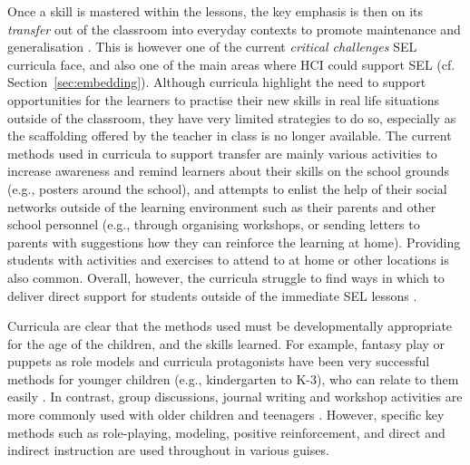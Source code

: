 \documentclass[prodmode,acmtochi]{acmsmall}
\newcommand{\todo}[1]{\textrm{\textrm{\textcolor{LightBlue}{[[#1]]}}}}
\newcommand{\todolater}[1]{}
\begin{document}
Once a skill is mastered within the lessons, the key emphasis is then on its \emph{transfer} out of the classroom into everyday contexts to promote maintenance and generalisation \cite{Elias1997,Maree2007,Pasi2001}. This is however one of the current \emph{critical challenges} SEL curricula face, and also one of the main areas where HCI could support SEL (cf. Section~\ref{sec:embedding}). Although curricula highlight the need to support opportunities for the learners to practise their new skills in real life situations outside of the classroom, they have very limited strategies to do so, especially as the scaffolding offered by the teacher in class is no longer available. The current methods used in curricula to support transfer are mainly various activities to increase awareness and remind learners about their skills on the school grounds (e.g., posters around the school), and attempts to enlist the help of their social networks outside of the learning environment such as their parents and other school personnel (e.g., through organising workshops, or sending letters to parents with suggestions how they can reinforce the learning at home). Providing students with activities and exercises to attend to at home or other locations is also common. Overall, however, the curricula struggle to find ways in which to deliver direct support for students outside of the immediate SEL lessons \cite{jones2012social,Maree2007}.  


Curricula are clear that the methods used must be developmentally appropriate for the age of the children, and the skills learned. For example, fantasy play or puppets as role models and curricula protagonists have been very successful methods for younger children (e.g., kindergarten to K-3), who can relate to them easily  \cite{Webster-Stratton2004}. In contrast, group discussions, journal writing and workshop activities are more commonly used with older children and teenagers \cite{dejong1994}. However, specific key methods such as role-playing, modeling, positive reinforcement, and direct and indirect instruction are used throughout in various guises. 
\todolater{Add example from SecondStep pointing to use of videorecordings and workshops for parents ==> highly useful... See \cite[p.88]{Elias1997}.}


\end{document}
